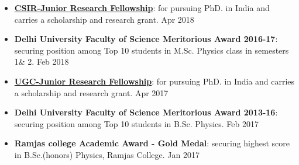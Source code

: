 \begin{itemize}
\item {\bf \href{https://drive.google.com/file/d/1yD3l3BYx1qn9Tvw0kq3EuNgfH1H4leNo/view?usp=sharing}{CSIR-Junior Research Fellowship}}: for pursuing PhD. in India and carries a scholarship and research grant. \hfill{Apr 2018}
\item {\bf Delhi University Faculty of Science Meritorious Award 2016-17}: securing position among Top 10 students in M.Sc. Physics class in semesters 1\& 2. \hfill{Feb 2018}
\item {\bf \href{https://drive.google.com/file/d/1FsXbm19ESBOyAwlxNG1YaapSN36eSof4/view?usp=sharing}{UGC-Junior Research Fellowship}}: for pursuing PhD. in India and carries a scholarship and research grant. \hfill{Apr 2017}
\item {\bf Delhi University Faculty of Science Meritorious Award 2013-16}: securing position among Top 10 students in B.Sc. Physics. \hfill{Feb 2017}
\item {\bf Ramjas college Academic Award - Gold Medal}: securing highest score in B.Sc.(honors) Physics, Ramjas College. \hfill{Jan 2017}
\end{itemize}
